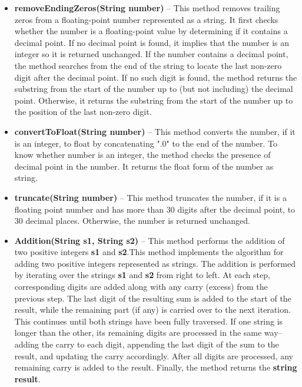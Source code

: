 \documentclass[a4paper,12pt]{article}
\begin{document}
\begin{itemize}
    \item \textbf{removeEndingZeros(String number)} -- This method removes trailing zeros from a floating-point number represented as a string. It first checks whether the number is a floating-point value by determining if it contains a decimal point. If no decimal point is found, it implies that the number is an integer so it is returned unchanged. If the number contains a decimal point, the method searches from the end of the string to locate the last non-zero digit after the decimal point. If no such digit is found, the method returns the substring from the start of the number up to (but not including) the decimal point. Otherwise, it returns the substring from the start of the number up to the position of the last non-zero digit.\\

    \item \textbf{convertToFloat(String number)} -- This method converts the number, if it is an integer, to float by concatenating "$.0$" to the end of the number. To know whether number is an integer, the method checks the presence of decimal point in the number. It returns the float form of the number as string.\\

    \item \textbf{truncate(String number)} -- This method truncates the number, if it is a floating point number and has more than 30 digits after the decimal point, to 30 decimal places. Otherwise, the number is returned unchanged.\\

    \item \textbf{Addition(String s1, String s2)} -- This method performs the addition of two positive integers \textbf{s1} and \textbf{s2}.This method implements the algorithm for adding two positive integers represented as strings. The addition is performed by iterating over the strings \textbf{s1} and \textbf{s2} from right to left. At each step, corresponding digits are added along with any carry (excess) from the previous step. The last digit of the resulting sum is added to the start of the result, while the remaining part (if any) is carried over to the next iteration. This continues until both strings have been fully traversed. If one string is longer than the other, its remaining digits are processed in the same way--adding the carry to each digit, appending the last digit of the sum to the result, and updating the carry accordingly. After all digits are processed, any remaining carry is added to the result. Finally, the method returns the \textbf{string result}.\\


\end{itemize}
\end{document}
